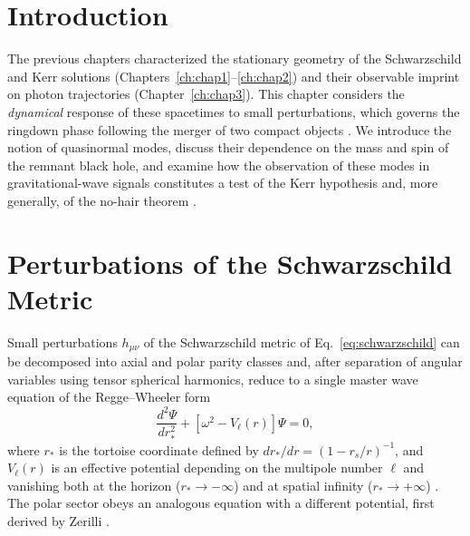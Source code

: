 \label{ch:chap4}

\section{Introduction}
The previous chapters characterized the stationary geometry of the Schwarzschild and Kerr solutions (Chapters~\ref{ch:chap1}--\ref{ch:chap2}) and their observable imprint on photon trajectories (Chapter~\ref{ch:chap3}). This chapter considers the \emph{dynamical} response of these spacetimes to small perturbations, which governs the ringdown phase following the merger of two compact objects \cite{regge1957}. We introduce the notion of quasinormal modes, discuss their dependence on the mass and spin of the remnant black hole, and examine how the observation of these modes in gravitational-wave signals constitutes a test of the Kerr hypothesis and, more generally, of the no-hair theorem \cite{berti2009}.

\section{Perturbations of the Schwarzschild Metric}

Small perturbations $h_{\mu\nu}$ of the Schwarzschild metric of Eq.~\eqref{eq:schwarzschild} can be decomposed into axial and polar parity classes and, after separation of angular variables using tensor spherical harmonics, reduce to a single master wave equation of the Regge--Wheeler form \cite{regge1957}
\begin{equation}
	\frac{d^2\Psi}{dr_*^2} + \left[\omega^2 - V_{\ell}(r)\right]\Psi = 0,
	\label{eq:regge-wheeler}
\end{equation}
where $r_*$ is the tortoise coordinate defined by $dr_*/dr = (1-r_s/r)^{-1}$, and $V_{\ell}(r)$ is an effective potential depending on the multipole number $\ell$ and vanishing both at the horizon ($r_*\to-\infty$) and at spatial infinity ($r_*\to+\infty$) \cite{misner1973}. The polar sector obeys an analogous equation with a different potential, first derived by Zerilli \cite{zerilli1970}.

